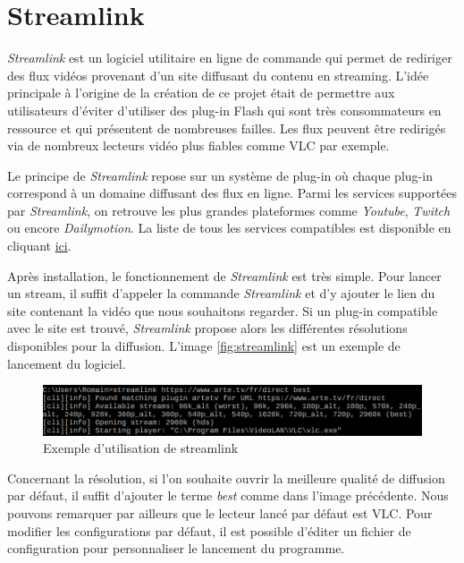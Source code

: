 \documentclass{polytech/polytech}
\begin{document}
\section{Streamlink}
\label{sec:streamlink}


\textit{Streamlink} est un logiciel utilitaire en ligne de commande qui permet de rediriger des flux vidéos provenant d'un site diffusant du contenu en streaming. L'idée principale à l'origine de la création de ce projet était de permettre aux utilisateurs d'éviter d'utiliser des plug-in Flash qui sont très consommateurs en ressource et qui présentent de nombreuses failles. Les flux peuvent être redirigés via de nombreux lecteurs vidéo plus fiables comme VLC par exemple. 

Le principe de \textit{Streamlink} repose sur un système de plug-in où chaque plug-in correspond à un domaine diffusant des flux en ligne. Parmi les services supportées par \textit{Streamlink}, on retrouve les plus grandes plateformes comme \textit{Youtube}, \textit{Twitch} ou encore \textit{Dailymotion}. La liste de tous les services compatibles est disponible en cliquant \href{https://streamlink.github.io/plugin_matrix.html#plugin-matrix}{ici}.

Après installation, le fonctionnement de \textit{Streamlink} est très simple. Pour lancer un stream, il suffit d'appeler la commande \textit{Streamlink} et d'y ajouter le lien du site contenant la vidéo que nous souhaitons regarder. Si un plug-in compatible avec le site est trouvé, \textit{Streamlink} propose alors les différentes résolutions disponibles pour la diffusion. L'image \autoref{fig:streamlink} est un exemple de lancement du logiciel. 

\begin{figure}
	\includegraphics[scale=0.75]{images/streamlink.png}
	\caption{Exemple d'utilisation de streamlink}
	\label{fig:streamlink}
\end{figure}

Concernant la résolution, si l'on souhaite ouvrir la meilleure qualité de diffusion par défaut, il suffit d'ajouter le terme \textit{best} comme dans l'image précédente. Nous pouvons remarquer par ailleurs que le lecteur lancé par défaut est VLC. Pour modifier les configurations par défaut, il est possible d'éditer un fichier de configuration pour personnaliser le lancement du programme. 
\end{document}
